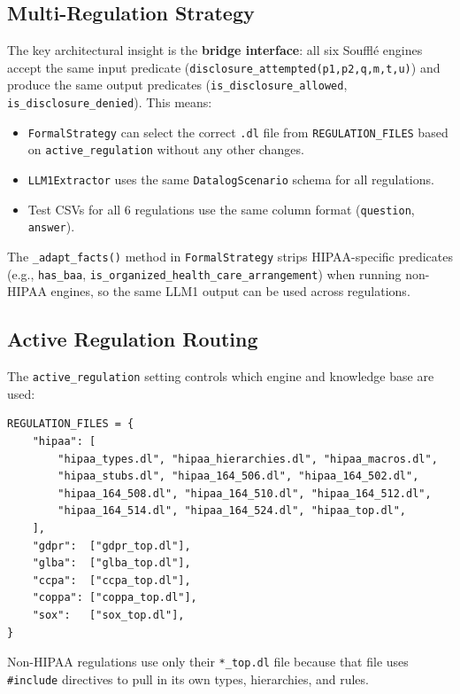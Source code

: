 \documentclass[11pt,letterpaper]{article}
\begin{document}
\begin{appendices}
\subsection{Multi-Regulation Strategy}

The key architectural insight is the \textbf{bridge interface}: all six Souffl\'{e} engines accept the same input predicate (\texttt{disclosure\_attempted(p1,p2,q,m,t,u)}) and produce the same output predicates (\texttt{is\_disclosure\_allowed}, \texttt{is\_disclosure\_denied}). This means:

\begin{itemize}
  \item \texttt{FormalStrategy} can select the correct \texttt{.dl} file from \texttt{REGULATION\_FILES} based on \texttt{active\_regulation} without any other changes.
  \item \texttt{LLM1Extractor} uses the same \texttt{DatalogScenario} schema for all regulations.
  \item Test CSVs for all 6 regulations use the same column format (\texttt{question}, \texttt{answer}).
\end{itemize}

The \texttt{\_adapt\_facts()} method in \texttt{FormalStrategy} strips HIPAA-specific predicates (e.g., \texttt{has\_baa}, \texttt{is\_organized\_health\_care\_arrangement}) when running non-HIPAA engines, so the same LLM1 output can be used across regulations.

\subsection{Active Regulation Routing}

The \texttt{active\_regulation} setting controls which engine and knowledge base are used:

\begin{lstlisting}[style=soufflestyle,caption={REGULATION\_FILES dict in app/strategies/formal.py}]
REGULATION_FILES = {
    "hipaa": [
        "hipaa_types.dl", "hipaa_hierarchies.dl", "hipaa_macros.dl",
        "hipaa_stubs.dl", "hipaa_164_506.dl", "hipaa_164_502.dl",
        "hipaa_164_508.dl", "hipaa_164_510.dl", "hipaa_164_512.dl",
        "hipaa_164_514.dl", "hipaa_164_524.dl", "hipaa_top.dl",
    ],
    "gdpr":  ["gdpr_top.dl"],
    "glba":  ["glba_top.dl"],
    "ccpa":  ["ccpa_top.dl"],
    "coppa": ["coppa_top.dl"],
    "sox":   ["sox_top.dl"],
}
\end{lstlisting}

Non-HIPAA regulations use only their \texttt{*\_top.dl} file because that file uses \texttt{\#include} directives to pull in its own types, hierarchies, and rules.



\end{appendices}
\end{document}
